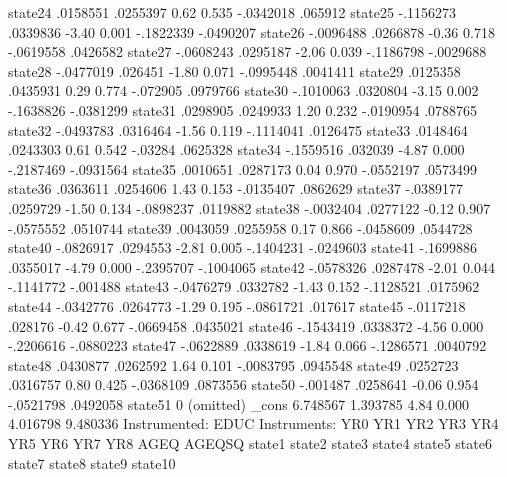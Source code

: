      state24 {\VBAR}   .0158551   .0255397     0.62   0.535    -.0342018     .065912
     state25 {\VBAR}  -.1156273   .0339836    -3.40   0.001    -.1822339   -.0490207
     state26 {\VBAR}  -.0096488   .0266878    -0.36   0.718    -.0619558    .0426582
     state27 {\VBAR}  -.0608243   .0295187    -2.06   0.039    -.1186798   -.0029688
     state28 {\VBAR}  -.0477019    .026451    -1.80   0.071    -.0995448    .0041411
     state29 {\VBAR}   .0125358   .0435931     0.29   0.774     -.072905    .0979766
     state30 {\VBAR}  -.1010063   .0320804    -3.15   0.002    -.1638826   -.0381299
     state31 {\VBAR}   .0298905   .0249933     1.20   0.232    -.0190954    .0788765
     state32 {\VBAR}  -.0493783   .0316464    -1.56   0.119    -.1114041    .0126475
     state33 {\VBAR}   .0148464   .0243303     0.61   0.542      -.03284    .0625328
     state34 {\VBAR}  -.1559516    .032039    -4.87   0.000    -.2187469   -.0931564
     state35 {\VBAR}   .0010651   .0287173     0.04   0.970    -.0552197    .0573499
     state36 {\VBAR}   .0363611   .0254606     1.43   0.153    -.0135407    .0862629
     state37 {\VBAR}  -.0389177   .0259729    -1.50   0.134    -.0898237    .0119882
     state38 {\VBAR}  -.0032404   .0277122    -0.12   0.907    -.0575552    .0510744
     state39 {\VBAR}   .0043059   .0255958     0.17   0.866    -.0458609    .0544728
     state40 {\VBAR}  -.0826917   .0294553    -2.81   0.005    -.1404231   -.0249603
     state41 {\VBAR}  -.1699886   .0355017    -4.79   0.000    -.2395707   -.1004065
     state42 {\VBAR}  -.0578326   .0287478    -2.01   0.044    -.1141772    -.001488
     state43 {\VBAR}  -.0476279   .0332782    -1.43   0.152    -.1128521    .0175962
     state44 {\VBAR}  -.0342776   .0264773    -1.29   0.195    -.0861721     .017617
     state45 {\VBAR}  -.0117218    .028176    -0.42   0.677    -.0669458    .0435021
     state46 {\VBAR}  -.1543419   .0338372    -4.56   0.000    -.2206616   -.0880223
     state47 {\VBAR}  -.0622889   .0338619    -1.84   0.066    -.1286571    .0040792
     state48 {\VBAR}   .0430877   .0262592     1.64   0.101    -.0083795    .0945548
     state49 {\VBAR}   .0252723   .0316757     0.80   0.425    -.0368109    .0873556
     state50 {\VBAR}   -.001487   .0258641    -0.06   0.954    -.0521798    .0492058
     state51 {\VBAR}          0  (omitted)
       _cons {\VBAR}   6.748567   1.393785     4.84   0.000     4.016798    9.480336
Instrumented:  EDUC
Instruments:   YR0 YR1 YR2 YR3 YR4 YR5 YR6 YR7 YR8 AGEQ AGEQSQ state1 state2
               state3 state4 state5 state6 state7 state8 state9 state10
